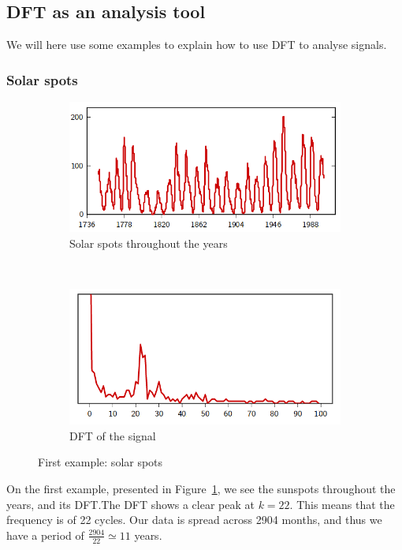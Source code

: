 \documentclass[11pt,a4paper]{article}
\begin{document}
\subsection{DFT as an analysis tool}
We will here use some examples to explain how to use DFT to analyse signals.
\subsubsection{Solar spots}
\begin{figure}[h]
	\centering
	\begin{subfigure}{1\textwidth}
		\centering%
		\includegraphics[scale=0.5]{images/solarSpots}%
		\caption{Solar spots throughout the years}%
	\end{subfigure}\\
	\begin{subfigure}{1\textwidth}%
		\centering%
		\includegraphics[scale=0.5]{images/solarSpots_dft}%
		\caption{DFT of the signal}%
	\end{subfigure}%
	\caption{First example: solar spots}%
	\label{figs:solar spots}%
\end{figure}
On the first example, presented in Figure\ \ref{figs:solar spots}, we see the sunspots throughout the years, and its DFT.\@ The DFT shows a clear peak at $k=22$. This means that the frequency is of 22 cycles. Our data is spread across 2904 months, and thus we have a period of $\frac{2904}{22} \simeq 11$ years.
\end{document}
